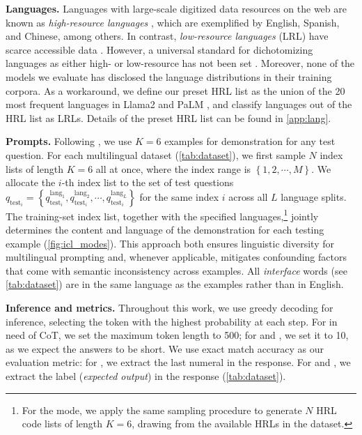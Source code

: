 \vspace{2pt}\noindent\textbf{Languages.}
Languages with large-scale digitized data resources on the web are known as \textit{high-resource languages} \citep[HRLs;][]{bender_rule}, which are exemplified by English, Spanish, and Chinese, among others.
In contrast, \textit{low-resource languages} (LRL) have scarce accessible data \cite{nllb}.
However, a universal standard for dichotomizing languages as either high- or low-resource has not been set \citep{bender_rule,state_and_fate_of_linguistic_diversity,survey_low_resource_nlp}.
Moreover, none of the models we evaluate has disclosed the language distributions in their training corpora.
As a workaround, we define our preset HRL list as the union of the 20 most frequent languages in \textsf{Llama2} \cite{llama2} and \textsf{PaLM} \cite{palm}, and classify languages out of the HRL list as LRLs.
Details of the preset HRL list can be found in \cref{app:lang}.


\vspace{2pt}\noindent\textbf{Prompts.} \label{sec:setup:prompts}
Following \citet{mgsm}, we use $K=6$ examples for demonstration for any test question.
For each multilingual dataset (\cref{tab:dataset}), we first sample $N$ index lists of length $K=6$ all at once, where the index range is $\left\{1, 2, \cdots, M\right\}.$
We allocate the $i$-th index list to the set of test questions $q_{\text{test}_i} = \left\{q_{\text{test}_i}^{\text{lang}_1}, q_{\text{test}_i}^{\text{lang}_2}, \cdots, q_{\text{test}_i}^{\text{lang}_L} \right\}$ for the same index $i$ across all $L$ language splits. The training-set index list, together with the specified languages,\footnote{
    For the \multilingual mode, we apply the same sampling procedure to generate $N$ HRL code lists of length $K=6$, drawing from the available HRLs in the dataset.
} jointly determines the content and language of the demonstration for each testing example (\cref{fig:icl_modes}).
This approach both ensures linguistic diversity for multilingual prompting and, whenever applicable, mitigates confounding factors that come with semantic inconsistency across examples.
All  \textit{interface} words (see \cref{tab:dataset}) are in the same language as the examples rather than in English.


\vspace{2pt}\noindent\textbf{Inference and metrics.}
Throughout this work, we use greedy decoding for inference, selecting the token with the highest probability at each step.
For \mgsm in need of CoT, we set the maximum token length to 500; for \xcopa and \xlwic, we set it to 10, as we expect the answers to be short.
We use exact match accuracy as our evaluation metric: for \mgsm, we extract the last numeral in the response. For \xcopa and \xlwic, we extract the label (\textit{expected output}) in the response (\cref{tab:dataset}).
